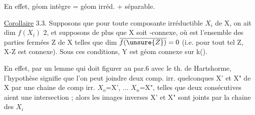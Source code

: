 En effet, géom intègre = géom irréd. + séparable.

\uline{Corollaire} 3.3. Supposons  que pour toute composante irréductible $X_i$
de X, on ait dim $f(X_i)$ 2, et supposons de plus que X soit -connexe,
où  est l'ensemble des parties fermées Z de X telles que dim $\overline{f(\unsure{Z})}=0$
(i.e. pour tout tel Z, X-Z est connexe). Sous ces conditions, Y est
géom connexe sur k().

En effet, par un lemme qui doit figurer au par.6 avec le th. de
Hartshorme, l'hypothèse signifie que l'on peut joindre deux comp. irr.
quelconques X' et X" de X par une chaine de comp irr. $X_o$=X', ...
$X_n$=X", telles que deux consécutives aient une intersection ; alors
les images inverses X' et X" sont joints par la chaine des $X_{i}$ 

